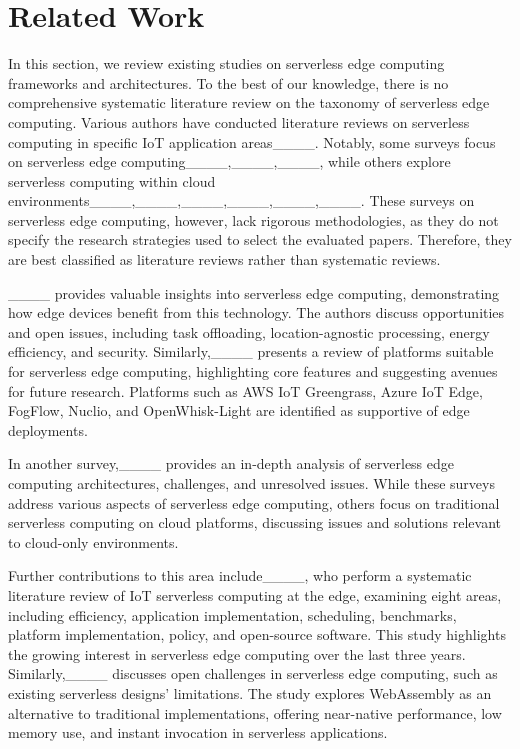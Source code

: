 \section{Related Work}
\label{Relatedwork}
In this section, we review existing studies on serverless edge computing frameworks and architectures. To the best of our knowledge, there is no comprehensive systematic literature review on the taxonomy of serverless edge computing. Various authors have conducted literature reviews on serverless computing in specific IoT application areas____. Notably, some surveys focus on serverless edge computing____,____,____, while others explore serverless computing within cloud environments____,____,____,____,____,____. These surveys on serverless edge computing, however, lack rigorous methodologies, as they do not specify the research strategies used to select the evaluated papers. Therefore, they are best classified as literature reviews rather than systematic reviews.

____ provides valuable insights into serverless edge computing, demonstrating how edge devices benefit from this technology. The authors discuss opportunities and open issues, including task offloading, location-agnostic processing, energy efficiency, and security. Similarly,____ presents a review of platforms suitable for serverless edge computing, highlighting core features and suggesting avenues for future research. Platforms such as AWS IoT Greengrass, Azure IoT Edge, FogFlow, Nuclio, and OpenWhisk-Light are identified as supportive of edge deployments.

In another survey,____ provides an in-depth analysis of serverless edge computing architectures, challenges, and unresolved issues. While these surveys address various aspects of serverless edge computing, others focus on traditional serverless computing on cloud platforms, discussing issues and solutions relevant to cloud-only environments.

Further contributions to this area include____, who perform a systematic literature review of IoT serverless computing at the edge, examining eight areas, including efficiency, application implementation, scheduling, benchmarks, platform implementation, policy, and open-source software. This study highlights the growing interest in serverless edge computing over the last three years. Similarly,____ discusses open challenges in serverless edge computing, such as existing serverless designs' limitations. The study explores WebAssembly as an alternative to traditional implementations, offering near-native performance, low memory use, and instant invocation in serverless applications.

